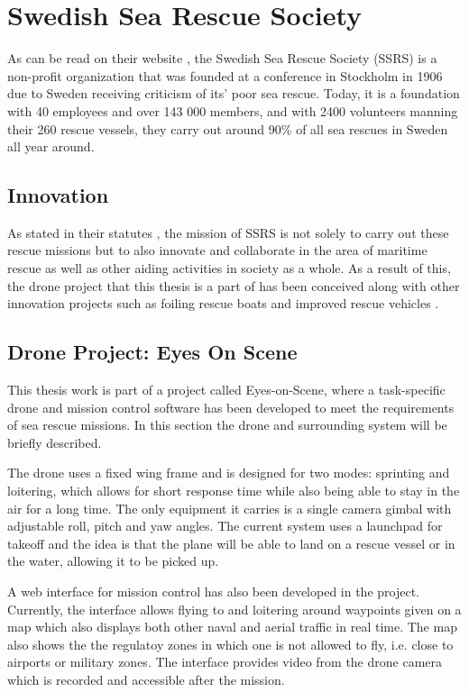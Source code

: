 \documentclass[nofilelist]{cslthse-msc}
\begin{document}
\section{Swedish Sea Rescue Society}
As can be read on their website \cite{ssrs}, the Swedish Sea Rescue Society (SSRS) is a non-profit organization that was founded at a conference in Stockholm in 1906 due to Sweden receiving criticism of its' poor sea rescue. Today, it is a foundation with 40 employees and over 143 000 members, and with 2400 volunteers manning their 260 rescue vessels, they carry out around 90\% of all sea rescues in Sweden all year around.

\subsection{Innovation}
As stated in their statutes \cite{ssrs-statues}, the mission of SSRS is not solely to carry out these rescue missions but to also innovate and collaborate in the area of maritime rescue as well as other aiding activities in society as a whole. As a result of this, the drone project that this thesis is a part of has been conceived along with other innovation projects such as foiling rescue boats and improved rescue vehicles \cite{surtsey-innovation}.

\subsection{Drone Project: Eyes On Scene}
This thesis work is part of a project called Eyes-on-Scene, where a task-specific drone and mission control software has been developed to meet the requirements of sea rescue missions. In this section the drone and surrounding system will be briefly described.

The drone uses a fixed wing frame and is designed for two modes: sprinting and loitering, which allows for short response time while also being able to stay in the air for a long time. The only equipment it carries is a single camera gimbal with adjustable roll, pitch and yaw angles. The current system uses a launchpad for takeoff and the idea is that the plane will be able to land on a rescue vessel or in the water, allowing it to be picked up. 

A web interface for mission control has also been developed in the project. Currently, the interface allows flying to and loitering around waypoints given on a map which also displays both other naval and aerial traffic in real time. The map also shows the the regulatoy zones in which one is not allowed to fly, i.e. close to airports or military zones. The interface provides video from the drone camera which is recorded and accessible after the mission.
\end{document}
